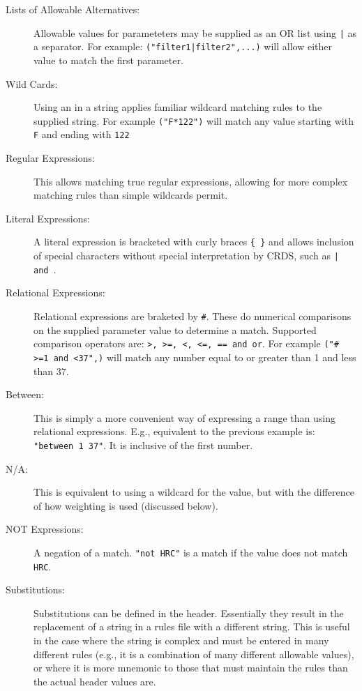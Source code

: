 \documentclass[final,authoryear,5p,times,twocolumn]{elsarticle}
\begin{document}
\begin{description}
\item[Lists of Allowable Alternatives:] Allowable values for parameteters
may be supplied as an \textquotesingle OR\textquotesingle
{\tt }list using {\tt |} as a separator. For example:
\texttt {({\ttfamily"}filter1|filter2{\ttfamily"},...)} will allow either value to match the first
parameter.
\item[Wild Cards:] Using an {\tt *} in a string applies familiar wildcard 
matching rules to the supplied string. For example 
\texttt {({\ttfamily"}F*122{\ttfamily"})} will
match any value starting with {\tt F} and ending with {\tt 122}
\item[Regular Expressions:] This allows matching true regular expressions,
allowing for more complex matching rules than simple wildcards permit.
\item[Literal Expressions:] A literal expression is bracketed with curly
braces {\tt \{ \}} and allows inclusion of special characters without 
special interpretation by CRDS, such as {\tt | and \*}.
\item[Relational Expressions:] Relational expressions are braketed by {\tt \#}.
These do numerical comparisons on the supplied parameter value to determine
a match. Supported comparison operators are: 
\texttt {\textgreater, \textgreater =, \textless, \textless =, == and or}. 
For example \texttt {({\ttfamily"}\# >=1 and <37",)} 
will match any number equal to or 
greater than 1 and less than 37.
\item[Between:] This is simply a more convenient way of expressing a range
than using relational expressions. E.g., equivalent to the previous example
is: \texttt{{\ttfamily"}between 1 37{\ttfamily"}}. It is inclusive of the first number.
\item[N/A:] This is equivalent to using a wildcard for the value, but with 
the difference of how weighting is used (discussed below). 
\item[NOT Expressions:] A negation of a match. 
\texttt {{\ttfamily"}not HRC{\ttfamily"}} 
is a match if the value does not match {\tt HRC}.
\item[Substitutions:] Substitutions can be defined in the header. Essentially
they result in the replacement of a string in a rules file with a different
string. This is useful in the case where the string is complex and must be 
entered in many different rules (e.g., it is a combination of many different 
allowable values), or where it is more mnemonic to those that must maintain
the rules than the actual header values are.
\end{description}
\end{document}
